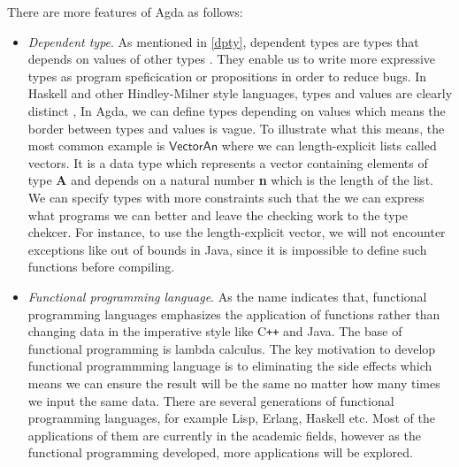 There are more features of Agda as follows:

\begin{itemize}
\item \textit{Dependent type}. 
As mentioned in \ref{dpty}, dependent types are types that depends on values of other types \cite{dtw}. They enable us to write more expressive types as program speficication or propositions in order to reduce bugs. In Haskell and other Hindley-Milner style languages, types and values are clearly distinct \cite{tutorial}, In Agda, we can define types depending on values which means the border between types and values is vague. To illustrate what this means, the most common example is $\mathsf{Vector A n}$ where we can length-explicit lists called vectors. It is a data type which represents a vector containing elements of type \textbf{A} and depends on a natural number \textbf{n} which is the length of the list. We can specify types with more constraints such that the we can express what programs we can better and leave the checking work to the type chekcer. For instance, to use the length-explicit vector, we will not encounter exceptions like out of bounds in Java, since it is impossible to define such functions before compiling.

\item \textit{Functional programming language}. As the name indicates that, functional programming languages emphasizes the application of functions rather than changing data in the imperative style like C{}\verb!++! and Java. The base of functional programming is lambda calculus. The key motivation to develop functional programmming language is to eliminating the side effects which means we can ensure the result will be the same no matter how many times we input the same data. There are several generations of functional programming languages, for example Lisp, Erlang, Haskell etc. Most of the applications of them are currently in the academic fields, however as the functional programming developed, more applications will be explored.


\end{itemize}

